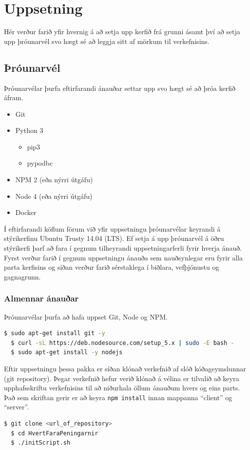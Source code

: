 \documentclass{article}
\theoremstyle{blueP}
\theoremstyle{greenS}
\begin{document}

\section{\Large Uppsetning}
Hér verður farið yfir hvernig á að setja upp kerfið frá grunni ásamt því að setja upp þróunarvél svo hægt sé að leggja sitt af mörkum til verkefnisins.

\subsection{Þróunarvél}
Þróunarvélar þurfa eftirfarandi ánauðar settar upp svo hægt sé að þróa kerfið áfram.
\begin{itemize}
  \item Git
  \item Python 3
  \begin{itemize}
    \item pip3
    \item pypodbc
  \end{itemize}
  \item NPM 2 (eða nýrri útgáfu)
  \item Node 4 (eða nýrri útgáfu)
  \item Docker
\end{itemize}

Í eftirfarandi köflum förum við yfir uppsetningu þróunarvélar keyrandi á stýrikerfinu Ubuntu Trusty 14.04 (LTS). Ef setja á upp þróunarvél á öðru stýrikerfi þarf að fara í gegnum tilheyrandi uppsetningarferli fyrir hverja ánauð. Fyrst verður farið í gegnum uppsetningu ánauða sem nauðsynlegar eru fyrir alla parta kerfisins og síðan verður farið sérstaklega í biðlara, vefþjónustu og gagnagrunn.

\subsubsection{Almennar ánauðar}
Þróunarvélar þurfa að hafa uppset Git, Node og NPM.
\begin{lstlisting}[language=bash]
  $ sudo apt-get install git -y
  $ curl -sL https://deb.nodesource.com/setup_5.x | sudo -E bash -
  $ sudo apt-get install -y nodejs
\end{lstlisting}

\noindent Eftir uppsetningu þessa pakka er síðan klónað verkefnið af slóð kóðageymslunnar (git repository). Þegar verkefnið hefur verið klónað á vélina er tilvalið að keyra upphafsskriftu verkefnisins til að niðurhala öllum ánauðum hvers og eins parts. Það sem skriftan gerir er að keyra \lstinline[language=bash]{npm install} innan mappanna ``client'' og ``server''.
\begin{lstlisting}[language=bash]
  $ git clone <url_of_repository>
  $ cd HvertFaraPeningarnir
  $ ./initScript.sh
\end{lstlisting}
\end{document}
